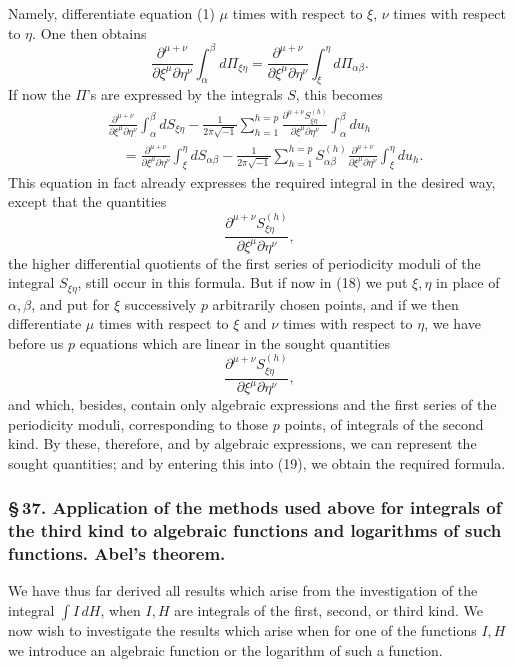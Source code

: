 \documentclass[10pt]{article}
\begin{document}
Namely, differentiate equation (1) \(\mu\) times with respect to \(\xi\), \(\nu\) times with respect to \(\eta\). One then obtains
\[
\frac{\partial^{\mu+\nu}}{\partial\xi^\mu\partial\eta^\nu}\int_{\alpha}^{\beta}d\Pi_{\xi\eta}
=
\frac{\partial^{\mu+\nu}}{\partial\xi^\mu\partial\eta^\nu}\int_{\xi}^{\eta}d\Pi_{\alpha\beta}.
\]
If now the \(\Pi\)'s are expressed by the integrals \(S\), this becomes
\[
\tag{19}
\begin{aligned}
&\frac{\partial^{\mu+\nu}}{\partial\xi^\mu\partial\eta^\nu}\int_{\alpha}^{\beta}dS_{\xi\eta}
-\frac{1}{2\pi\sqrt{-1}}\sum_{h=1}^{h=p}
\frac{\partial^{\mu+\nu}S_{\xi\eta}^{(h)}}{\partial\xi^\mu\partial\eta^\nu}\int_{\alpha}^{\beta}du_h\\
&\quad=\frac{\partial^{\mu+\nu}}{\partial\xi^\mu\partial\eta^\nu}\int_{\xi}^{\eta}dS_{\alpha\beta}
-\frac{1}{2\pi\sqrt{-1}}\sum_{h=1}^{h=p}S_{\alpha\beta}^{(h)}
\frac{\partial^{\mu+\nu}}{\partial\xi^\mu\partial\eta^\nu}\int_{\xi}^{\eta}du_h.
\end{aligned}
\]
This equation in fact already expresses the required integral in the desired way, except that the quantities
\[
\frac{\partial^{\mu+\nu}S_{\xi\eta}^{(h)}}{\partial\xi^\mu\partial\eta^\nu},
\]
the higher differential quotients of the first series of periodicity moduli of the integral \(S_{\xi\eta}\), still occur in this formula. But if now in (18) we put \(\xi,\eta\) in place of \(\alpha,\beta\), and put for \(\xi\) successively \(p\) arbitrarily chosen points, and if we then differentiate \(\mu\) times with respect to \(\xi\) and \(\nu\) times with respect to \(\eta\), we have before us \(p\) equations which are linear in the sought quantities
\[
\frac{\partial^{\mu+\nu}S_{\xi\eta}^{(h)}}{\partial\xi^\mu\partial\eta^\nu},
\]
and which, besides, contain only algebraic expressions and the first series of the periodicity moduli, corresponding to those \(p\) points, of integrals of the second kind. By these, therefore, and by algebraic expressions, we can represent the sought quantities; and by entering this into (19), we obtain the required formula.

\subsubsection*{\S\,37. Application of the methods used above for integrals of the third kind to algebraic functions and logarithms of such functions. Abel's theorem.}

We have thus far derived all results which arise from the investigation of the integral \(\int I\,dH\), when \(I,H\) are integrals of the first, second, or third kind. We now wish to investigate the results which arise when for one of the functions \(I,H\) we introduce an algebraic function or the logarithm of such a function.
\end{document}
